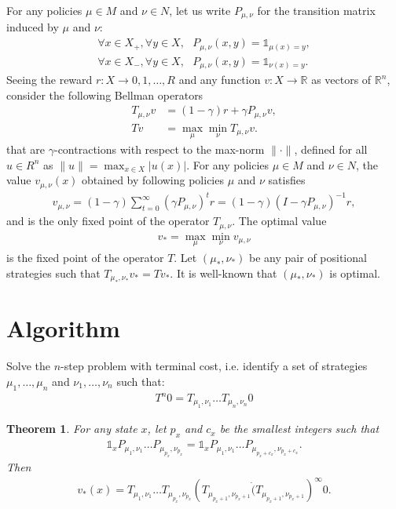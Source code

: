 \documentclass{article}
\newtheorem{theorem}{Theorem}
\def\R{\mathds R}
\def\1{{\mathds 1}}
\begin{document}
For any policies $\mu \in M$ and $\nu \in N$, let us write $P_{\mu,\nu}$ for the transition matrix induced by $\mu$ and $\nu$:
\begin{align}
  \forall x \in X_+, \forall y \in X, ~~~P_{\mu,\nu}(x,y)=\1_{\mu(x)=y}, \\
  \forall x \in X_-, \forall y \in X, ~~~P_{\mu,\nu}(x,y)=\1_{\nu(x)=y}.
\end{align} 
Seeing the reward $r:X \to {0,1,\dots,R}$ and any function $v:X \to \R$ as vectors of $\R^n$, consider the following Bellman operators
\begin{align}
  T_{\mu,\nu}v & = (1-\gamma)r + \gamma P_{\mu,\nu}v, \\
  T v & =\max_\mu \min_\nu T_{\mu,\nu }v .
\end{align}
that are $\gamma$-contractions with respect to the max-norm $\|\cdot\|$, defined for all $u \in R^n$ as $\|u\|=\max_{x \in X} |u(x)|$.
For any policies $\mu \in M$ and $\nu \in N$, the value $v_{\mu,\nu}(x)$ obtained by following policies $\mu$ and $\nu$ satisfies
\begin{align}
v_{\mu,\nu} = (1-\gamma)\sum_{t=0}^\infty (\gamma P_{\mu,\nu})^t r = (1-\gamma)(I-\gamma P_{\mu,\nu})^{-1}r,
\end{align}
and is the only fixed point of the operator $T_{\mu,\nu}$.
The optimal value
\begin{align}
  v_* = \max_{\mu} \min_{\nu} v_{\mu,\nu}
\end{align}
is the fixed point of the operator $T$. Let $(\mu_*,\nu_*)$ be any pair of positional strategies such that $T_{\mu_*,\nu_*}v_*=T v_*$. It is well-known that $(\mu_*,\nu_*)$ is optimal.


\section{Algorithm}

Solve the $n$-step problem with terminal cost, i.e. identify a set of strategies $\mu_1,\dots,\mu_n$ and $\nu_1,\dots,\nu_n$ such that:
\begin{align}
  T^n 0 = T_{\mu_1,\nu_1} \dots T_{\mu_n,\nu_n}0
\end{align}

\begin{theorem}
  For any state $x$, let $p_x$ and $c_x$ be the smallest integers such that
  \begin{align}
    \1_x P_{\mu_1,\nu_1} \dots P_{\mu_{p_x},\nu_{p_x}} = \1_x P_{\mu_1,\nu_1} \dots P_{\mu_{p_x+c_x},\nu_{p_x+c_x}}.
  \end{align}
  Then
  \begin{align}
    v_*(x) = T_{\mu_1,\nu_1}\dots T_{\mu_{p_x},\nu_{p_x}} (T_{\mu_{p_x+1},\nu_{p_x+1}} \dot(T_{\mu_{p_x+1},\nu_{p_x+1}} )^\infty 0.  
  \end{align}
\end{theorem}
\end{document}
